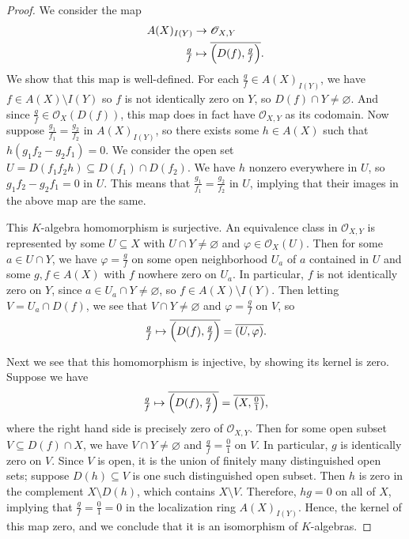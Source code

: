 \documentclass[12pt]{article}
\theoremstyle{definition}
\renewcommand{\phi}{\varphi}
\renewcommand{\emptyset}{\varnothing}
\newcommand{\<}{\langle}
\renewcommand{\>}{\rangle}
\renewcommand{\O}{\mathscr{O}}
\newcommand{\eqc}{\overline}
\begin{document}
\begin{proof}
    We consider the map
    \begin{align*}
        A(X)_{I(Y)} &\to \O_{X, Y} \\
        \tfrac{g}{f} &\mapsto \eqc{\qty(D(f), \tfrac{g}{f})}.
    \end{align*}
    We show that this map is well-defined. For each $\frac{g}{f} \in A(X)_{I(Y)}$, we have $f \in A(X) \setminus I(Y)$ so $f$ is not identically zero on $Y$, so $D(f) \cap Y \ne \emptyset$. And since $\frac{g}{f} \in \O_X(D(f))$, this map does in fact have $\O_{X, Y}$ as its codomain. Now suppose $\frac{g_1}{f_1} = \frac{g_2}{f_2}$ in $A(X)_{I(Y)}$, so there exists some $h \in A(X)$ such that $h(g_1f_2 - g_2f_1) = 0$. We consider the open set $U = D(f_1f_2h) \subseteq D(f_1) \cap D(f_2)$. We have $h$ nonzero everywhere in $U$, so $g_1f_2 - g_2f_1 = 0$ in $U$. This means that $\frac{g_1}{f_1} = \frac{g_2}{f_2}$ in $U$, implying that their images in the above map are the same.

    This $K$-algebra homomorphism is surjective. An equivalence class in $\O_{X, Y}$ is represented by some $U \subseteq X$ with $U \cap Y \ne \emptyset$ and $\phi \in \O_X(U)$. Then for some $a \in U \cap Y$, we have $\phi= \frac{g}{f}$ on some open neighborhood $U_a$ of $a$ contained in $U$ and some $g, f \in A(X)$ with $f$ nowhere zero on $U_a$. In particular, $f$ is not identically zero on $Y$, since $a \in U_a \cap Y \ne \emptyset$, so $f \in A(X) \setminus I(Y)$. Then letting $V = U_a \cap D(f)$, we see that $V \cap Y \ne \emptyset$ and $\phi = \frac{g}{f}$ on $V$, so
    \[
        \tfrac{g}{f} \mapsto \eqc{\qty(D(f), \tfrac{g}{f})} = \eqc{\qty(U, \phi)}.
    \]

    Next we see that this homomorphism is injective, by showing its kernel is zero. Suppose we have
    \[
        \tfrac{g}{f} \mapsto \eqc{\qty(D(f), \tfrac{g}{f})} = \eqc{\qty(X, \tfrac{0}{1})},
    \]
    where the right hand side is precisely zero of $\O_{X, Y}$. Then for some open subset $V \subseteq D(f) \cap X$, we have $V \cap Y \ne \emptyset$ and $\frac{g}{f} = \frac{0}{1}$ on $V$. In particular, $g$ is identically zero on $V$. Since $V$ is open, it is the union of finitely many distinguished open sets; suppose $D(h) \subseteq V$ is one such distinguished open subset. Then $h$ is zero in the complement $X \setminus D(h)$, which contains $X \setminus V$. Therefore, $hg = 0$ on all of $X$, implying that $\frac{g}{f} = \frac{0}{1} = 0$ in the localization ring $A(X)_{I(Y)}$. Hence, the kernel of this map zero, and we conclude that it is an isomorphism of $K$-algebras.

\end{proof}
\end{document}
